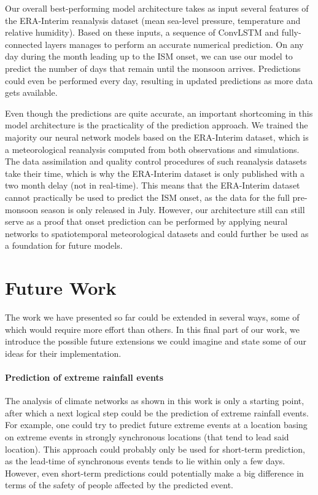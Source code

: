 Our overall best-performing model architecture takes as input several features of the ERA-Interim reanalysis dataset (mean sea-level pressure, temperature and relative humidity). Based on these inputs, a sequence of ConvLSTM and fully-connected layers manages to perform an accurate numerical prediction. On any day during the month leading up to the ISM onset, we can use our model to predict the number of days that remain until the monsoon arrives. Predictions could even be performed every day, resulting in updated predictions as more data gets available.

Even though the predictions are quite accurate, an important shortcoming in this model architecture is the practicality of the prediction approach. We trained the majority our neural network models based on the ERA-Interim dataset, which is a meteorological reanalysis computed from both observations and simulations. The data assimilation and quality control procedures of such reanalysis datasets take their time, which is why the ERA-Interim dataset is only published with a two month delay (not in real-time). This means that the ERA-Interim dataset cannot practically be used to predict the ISM onset, as the data for the full pre-monsoon season is only released in July. However, our architecture still can still serve as a proof that onset prediction can be performed by applying neural networks to spatiotemporal meteorological datasets and could further be used as a foundation for future models.

\newpage
\section{Future Work}
\label{st:conclusion_outlook}
The work we have presented so far could be extended in several ways, some of which would require more effort than others. In this final part of our work, we introduce the possible future extensions we could imagine and state some of our ideas for their implementation.

\paragraph{Prediction of extreme rainfall events}
The analysis of climate networks as shown in this work is only a starting point, after which a next logical step could be the prediction of extreme rainfall events. For example, one could try to predict future extreme events at a location basing on extreme events in strongly synchronous locations (that tend to lead said location).  This approach could probably only be used for short-term prediction, as the lead-time of synchronous events tends to lie within only a few days. However, even short-term predictions could potentially make a big difference in terms of the safety of people affected by the predicted event.

